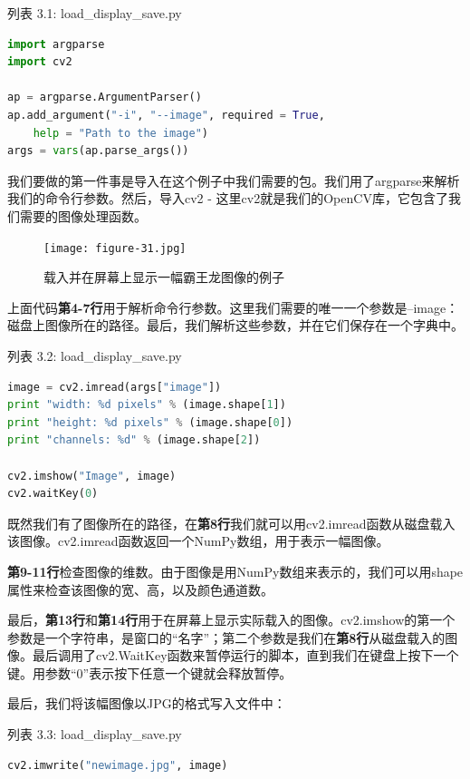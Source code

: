 \documentclass[color=cyan,mathpazo,titlestyle=hang]{elegantbook}
\begin{document}
列表 3.1: load\_display\_save.py

\begin{lstlisting}[language=python]
import argparse
import cv2

ap = argparse.ArgumentParser()
ap.add_argument("-i", "--image", required = True,
	help = "Path to the image")
args = vars(ap.parse_args())
\end{lstlisting}

我们要做的第一件事是导入在这个例子中我们需要的包。我们用了argparse来解析我们的命令行参数。然后，导入cv2 - 这里cv2就是我们的OpenCV库，它包含了我们需要的图像处理函数。

\begin{figure}[!hbtp]
\centering  %
\texttt{[image: figure-31.jpg]}
\caption{载入并在屏幕上显示一幅霸王龙图像的例子\label{figur:Tyrannosaurus-Rex}}
\end{figure}

上面代码\textbf{第4-7行}用于解析命令行参数。这里我们需要的唯一一个参数是--image：磁盘上图像所在的路径。最后，我们解析这些参数，并在它们保存在一个字典中。

列表 3.2: load\_display\_save.py

\begin{lstlisting}[language=python]
image = cv2.imread(args["image"])
print "width: %d pixels" % (image.shape[1])
print "height: %d pixels" % (image.shape[0])
print "channels: %d" % (image.shape[2])

cv2.imshow("Image", image)
cv2.waitKey(0)
\end{lstlisting}

既然我们有了图像所在的路径，在\textbf{第8行}我们就可以用cv2.imread函数从磁盘载入该图像。cv2.imread函数返回一个NumPy数组，用于表示一幅图像。

\textbf{第9-11行}检查图像的维数。由于图像是用NumPy数组来表示的，我们可以用shape属性来检查该图像的宽、高，以及颜色通道数。

最后，\textbf{第13行}和\textbf{第14行}用于在屏幕上显示实际载入的图像。cv2.imshow的第一个参数是一个字符串，是窗口的“名字”；第二个参数是我们在\textbf{第8行}从磁盘载入的图像。最后调用了cv2.WaitKey函数来暂停运行的脚本，直到我们在键盘上按下一个键。用参数“0”表示按下任意一个键就会释放暂停。

最后，我们将该幅图像以JPG的格式写入文件中：

列表 3.3: load\_display\_save.py

\begin{lstlisting}[language=python]
cv2.imwrite("newimage.jpg", image)
\end{lstlisting}
\end{document}
